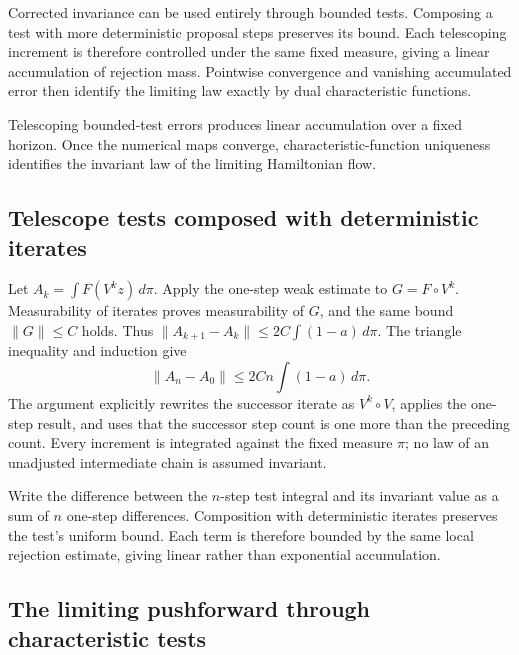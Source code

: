 \documentclass[11pt,a4paper]{report}
\begin{document}
Corrected invariance can be used entirely through bounded tests. Composing a test with more deterministic proposal steps preserves its bound. Each telescoping increment is therefore controlled under the same fixed measure, giving a linear accumulation of rejection mass. Pointwise convergence and vanishing accumulated error then identify the limiting law exactly by dual characteristic functions.



Telescoping bounded-test errors produces linear accumulation over a fixed horizon. Once the numerical maps converge, characteristic-function uniqueness identifies the invariant law of the limiting Hamiltonian flow.

\subsection{\texorpdfstring{Telescope tests composed with deterministic iterates}{Telescope tests composed with deterministic iterates}}
\label{report-step-KineticLangevin-HamiltonianIteration-lean-1}


Let \(A_k=\int F(V^kz)\,d\pi\). Apply the one-step weak estimate to \(G=F\circ V^k\). Measurability of iterates proves measurability of \(G\), and the same bound \(\|G\|\le C\) holds. Thus \(\|A_{k+1}-A_k\|\le2C\int(1-a)\,d\pi\). The triangle inequality and induction give \[\|A_n-A_0\|\le2Cn\int(1-a)\,d\pi.\] The argument explicitly rewrites the successor iterate as \(V^k\circ V\), applies the one-step result, and uses that the successor step count is one more than the preceding count. Every increment is integrated against the fixed measure \(\pi\); no law of an unadjusted intermediate chain is assumed invariant.



Write the difference between the \(n\)-step test integral and its invariant value as a sum of \(n\) one-step differences. Composition with deterministic iterates preserves the test’s uniform bound. Each term is therefore bounded by the same local rejection estimate, giving linear rather than exponential accumulation.

\subsection{\texorpdfstring{The limiting pushforward through characteristic tests}{The limiting pushforward through characteristic tests}}
\label{report-step-KineticLangevin-HamiltonianIteration-lean-2}
\end{document}

